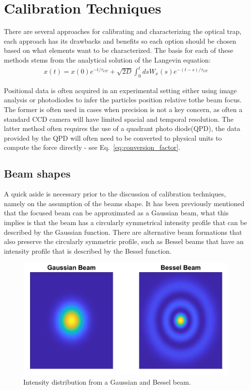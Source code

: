 
\section{Calibration Techniques}
\label{sec:calibration_techniques}
There are several approaches for calibrating and characterizing 
the optical trap, each approach has its drawbacks and benefits 
so each option should be chosen based on what elements want to 
be characterized. The basis for each of these methods stems from 
the analytical solution of the Langevin equation:
\begin{align}
	\label{eq:anylitical_lang}
	x(t) = x(0)e^{-t/\tau_{OT}}+\sqrt{2D}\int^t_0dsW_x(s)e^{-(t-s)/\tau_{OT}}
\end{align}

Positional data is often acquired in an experimental setting 
either using image analysis or photodiodes to infer the particles 
position relative tothe beam focus. The former is often used in 
cases when precision is not a key concern, as often a standard 
CCD camera will have limited spacial and temporal resolution. 
The latter method often requires the use of a quadrant photo 
diode(QPD), the data provided by the QPD will often need to be 
converted to physical units to compute the force directly - see Eq.~\eqref{eq:conversion_factor}.

\subsection{Beam shapes}
A quick aside is necessary prior to the discussion 
of calibration techniques, namely on the assumption 
of the beams shape. It has been previously mentioned 
that the focused beam can be approximated as a 
Gaussian beam, what this implies is that the beam has 
a circularly symmetrical intensity profile that can be
described by the Gaussian function. There are alternative 
beam formations that also preserve the circularly 
symmetric profile, such as Bessel beams that have an 
intensity profile that is described by the Bessel 
function. 
\begin{figure}
	\centering
	\includegraphics[width=\linewidth]{Gaussian_Bessel.png}
	\caption{Intensity distribution from a Gaussian and Bessel
	beam.}
\end{figure}

